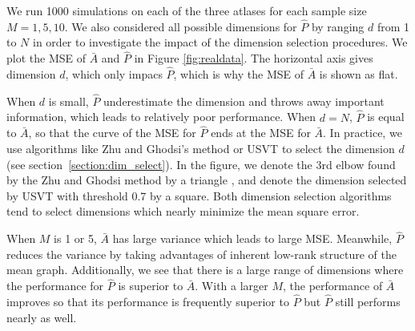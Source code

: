 \documentclass[a4paper]{article}
\begin{document}

We run 1000 simulations on each of the three atlases for each sample size $M=1,5,10$.
We also considered all possible dimensions for $\hat{P}$ by ranging $d$ from 1 to $N$ in order to investigate the impact of the dimension selection procedures.
We plot the MSE of $\bar{A}$ and $\hat{P}$ in Figure \ref{fig:realdata}.
The horizontal axis gives dimension $d$, which only impacs $\hat{P}$, which is why the MSE of $\bar{A}$ is shown as flat.

When $d$ is small, $\hat{P}$ underestimate the dimension and throws away important information, which leads to relatively poor performance. When $d=N$, $\hat{P}$ is equal to $\bar{A}$, so that the curve of the MSE for $\hat{P}$ ends at the MSE for $\bar{A}$. 
In practice, we use algorithms like Zhu and Ghodsi's method or USVT to select the dimension $d$ (see section~\ref{section:dim_select}). 
In the figure, we denote the 3rd elbow found by the Zhu and Ghodsi method by a triangle , and denote the dimension selected by USVT with threshold 0.7 by a square. 
Both dimension selection algorithms tend to select dimensions which nearly minimize the mean square error.

When $M$ is 1 or 5, $\bar{A}$ has large variance which leads to large MSE. Meanwhile, $\hat{P}$ reduces the variance by taking advantages of inherent low-rank structure of the mean graph. Additionally, we see that there is a large range of dimensions where the performance for $\hat{P}$ is superior to $\bar{A}$. 
With a larger $M$, the performance of $\bar{A}$ improves so that its performance is frequently superior to $\hat{P}$ but $\hat{P}$ still performs nearly as well.
\end{document}
